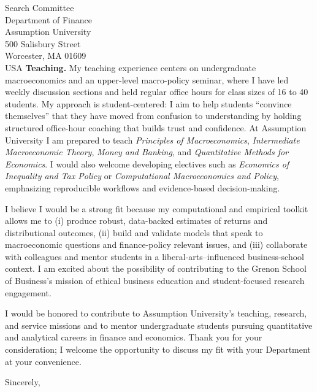 \documentclass[11pt,letterpaper]{letter}
\begin{document}
\begin{letter}{Search Committee \\
Department of Finance \\
Assumption University \\
500 Salisbury Street \\ 
Worcester, MA 01609 \\ USA}
\textbf{Teaching.} My teaching experience centers on undergraduate macroeconomics and an upper-level macro-policy seminar, where I have led weekly discussion sections and held regular office hours for class sizes of 16 to 40 students. My approach is student-centered: I aim to help students “convince themselves” that they have moved from confusion to understanding by holding structured office-hour coaching that builds trust and confidence. At Assumption University I am prepared to teach \textit{Principles of Macroeconomics}, \textit{Intermediate Macroeconomic Theory}, \textit{Money and Banking}, and \textit{Quantitative Methods for Economics}. I would also welcome developing electives such as \textit{Economics of Inequality and Tax Policy} or \textit{Computational Macroeconomics and Policy}, emphasizing reproducible workflows and evidence-based decision-making.

I believe I would be a strong fit because my computational and empirical toolkit allows me to (i) produce robust, data-backed estimates of returns and distributional outcomes, (ii) build and validate models that speak to macroeconomic questions and finance-policy relevant issues, and (iii) collaborate with colleagues and mentor students in a liberal-arts–influenced business-school context. I am excited about the possibility of contributing to the Grenon School of Business’s mission of ethical business education and student-focused research engagement.

I would be honored to contribute to Assumption University’s teaching, research, and service missions and to mentor undergraduate students pursuing quantitative and analytical careers in finance and economics. Thank you for your consideration; I welcome the opportunity to discuss my fit with your Department at your convenience.

\closing{Sincerely,}

\end{letter}
\end{document}
